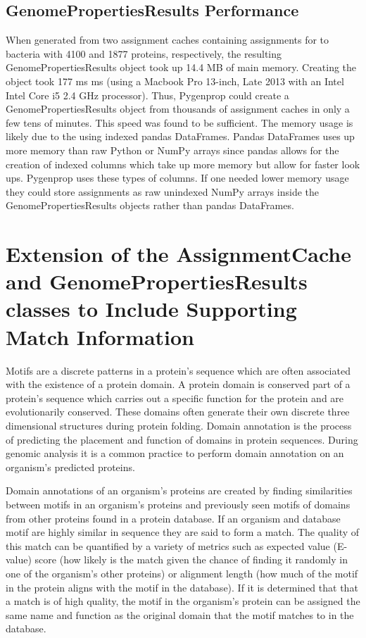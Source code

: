 \subsection{GenomePropertiesResults Performance}

When generated from two assignment caches containing assignments for to bacteria with 4100 and 1877 proteins, respectively, the resulting GenomePropertiesResults object took up 14.4 MB of main memory. Creating the  object took 177 ms  ms (using a Macbook Pro 13-inch, Late 2013 with an Intel Intel Core i5 2.4 GHz processor). Thus, Pygenprop could create a GenomePropertiesResults object from thousands of assignment caches in only a few tens of minutes. This speed was found to be sufficient. The memory usage is likely due to the using indexed pandas DataFrames. Pandas DataFrames uses up more memory than raw Python or NumPy arrays since pandas allows for the creation of indexed columns which take up more memory but allow for faster look ups. Pygenprop uses these types of columns. If one needed lower memory usage they could store assignments as raw unindexed NumPy arrays inside the GenomePropertiesResults objects rather than pandas DataFrames. 

\section{Extension of the AssignmentCache and GenomePropertiesResults classes to Include Supporting Match Information}

Motifs are a discrete patterns in a protein's sequence which are often associated with the existence of a protein domain. A protein domain is conserved part of a protein's sequence which carries out a specific function for the protein and are evolutionarily conserved. These domains often generate their own discrete three dimensional structures during protein folding. Domain annotation is the process of predicting the placement and function of domains in protein sequences. During genomic analysis it is a common practice to perform domain annotation on an organism's predicted proteins.

Domain annotations of an organism's proteins are created by finding similarities between motifs in an organism's proteins and previously seen motifs of domains from other proteins found in a protein database. If an organism and database motif are highly similar in sequence they are said to form a match. The quality of this match can be quantified by a variety of metrics such as expected value (E-value) score (how likely is the match given the chance of finding it randomly in one of the organism's other proteins) or alignment length (how much of the motif in the protein aligns with the motif in the database). If it is determined that that a match is of high quality, the motif in the organism's protein can be assigned the same name and function as the original domain that the motif matches to in the database.


